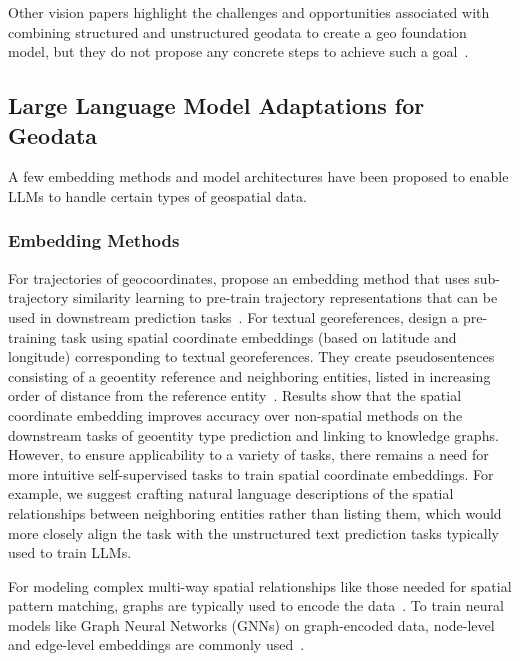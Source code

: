 Other vision papers highlight the challenges and opportunities associated with combining structured and unstructured geodata to create a geo foundation model, but they do not propose any concrete steps to achieve such a goal~\cite{Xie2023, Tan2023}.
%
%


\subsection{Large Language Model Adaptations for Geodata}
A few embedding methods and model architectures have been proposed to enable LLMs to handle certain types of geospatial data.

\subsubsection{Embedding Methods}
For trajectories of geocoordinates, \citeauthor{Hu2023} propose an embedding method that uses sub-trajectory similarity learning to pre-train trajectory representations that can be used in downstream prediction tasks~\cite{Hu2023}.
%
For textual georeferences, \citeauthor{Li2021} design a pre-training task using spatial coordinate embeddings (based on latitude and longitude) corresponding to textual georeferences.
They create pseudosentences consisting of a geoentity reference and neighboring entities, listed in increasing order of distance from the reference entity~\cite{Li2021}.
Results show that the spatial coordinate embedding improves accuracy over non-spatial methods on the downstream tasks of geoentity type prediction and linking to knowledge graphs.
However, to ensure applicability to a variety of tasks, there remains a need for more intuitive self-supervised tasks to train spatial coordinate embeddings.
For example, we suggest crafting natural language descriptions of the spatial relationships between neighboring entities rather than listing them, which would more closely align the task with the unstructured text prediction tasks typically used to train LLMs.

For modeling complex multi-way spatial relationships like those needed for spatial pattern matching, graphs are typically used to encode the data~\cite{Folkers2000, Chen2019, Fang2019}.
To train neural models like Graph Neural Networks (GNNs) on graph-encoded data, node-level and edge-level embeddings are commonly used~\cite{Bai2019,Krlevza2016,Liu2020Neural}.


